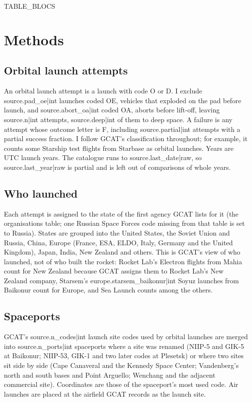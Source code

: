 \documentclass[11pt,a4paper]{article}
\begin{document}
{{TABLE_BLOCS}}

\section{Methods}
\subsection{Orbital launch attempts}
An orbital launch attempt is a launch with code O or D. I exclude {{source.pad_oe|int}} launches coded OE, vehicles that exploded on the pad before launch, and {{source.abort_oa|int}} coded OA, aborts before lift-off, leaving {{source.n|int}} attempts, {{source.deep|int}} of them to deep space. A failure is any attempt whose outcome letter is F, including {{source.partial|int}} attempts with a partial success fraction. I follow GCAT's classification throughout; for example, it counts some Starship test flights from Starbase as orbital launches. Years are UTC launch years. The catalogue runs to {{source.last_date|raw}}, so {{source.last_year|raw}} is partial and is left out of comparisons of whole years.

\subsection{Who launched}
Each attempt is assigned to the state of the first agency GCAT lists for it (the organisations table; one Russian Space Forces code missing from that table is set to Russia). States are grouped into the United States, the Soviet Union and Russia, China, Europe (France, ESA, ELDO, Italy, Germany and the United Kingdom), Japan, India, New Zealand and others. This is GCAT's view of who launched, not of who built the rocket: Rocket Lab's Electron flights from Mahia count for New Zealand because GCAT assigns them to Rocket Lab's New Zealand company, Starsem's {{europe.starsem_baikonur|int}} Soyuz launches from Baikonur count for Europe, and Sea Launch counts among the others.

\subsection{Spaceports}
GCAT's {{source.n_codes|int}} launch site codes used by orbital launches are merged into {{source.n_ports|int}} spaceports where a site was renamed (NIIP-5 and GIK-5 at Baikonur; NIIP-53, GIK-1 and two later codes at Plesetsk) or where two sites sit side by side (Cape Canaveral and the Kennedy Space Center; Vandenberg's north and south bases and Point Arguello; Wenchang and the adjacent commercial site). Coordinates are those of the spaceport's most used code. Air launches are placed at the airfield GCAT records as the launch site.
\end{document}
